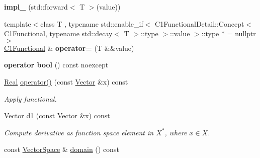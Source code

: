\begin{DoxyCompactItemize}
\item 
\hypertarget{classSpacy_1_1C1Functional_a250d4ea5bc261d8719c1ebb0a5037aac}{{\bfseries impl\-\_\-} (std\-::forward$<$ \-T $>$(value))}\label{classSpacy_1_1C1Functional_a250d4ea5bc261d8719c1ebb0a5037aac}

\item 
\hypertarget{classSpacy_1_1C1Functional_a1a6c4893ea11ebeff6647fc12f8b979d}{{\footnotesize template$<$class T , typename std\-::enable\-\_\-if$<$ C1\-Functional\-Detail\-::\-Concept$<$ C1\-Functional, typename std\-::decay$<$ T $>$\-::type $>$\-::value $>$\-::type $\ast$  = nullptr$>$ }\\\hyperlink{classSpacy_1_1C1Functional}{\-C1\-Functional} \& {\bfseries operator=} (\-T \&\&value)}\label{classSpacy_1_1C1Functional_a1a6c4893ea11ebeff6647fc12f8b979d}

\item 
\hypertarget{classSpacy_1_1C1Functional_a0b5ae1057d50803d71c7e221424e1ed4}{{\bfseries operator bool} () const noexcept}\label{classSpacy_1_1C1Functional_a0b5ae1057d50803d71c7e221424e1ed4}

\item 
\hypertarget{classSpacy_1_1C1Functional_a621b710f0c8c583d074f4bf4da3cbb09}{\hyperlink{classSpacy_1_1Real}{\-Real} \hyperlink{classSpacy_1_1C1Functional_a621b710f0c8c583d074f4bf4da3cbb09}{operator()} (const \hyperlink{classSpacy_1_1Vector}{\-Vector} \&x) const }\label{classSpacy_1_1C1Functional_a621b710f0c8c583d074f4bf4da3cbb09}

\begin{DoxyCompactList}\small\item\em \-Apply functional. \end{DoxyCompactList}\item 
\hypertarget{classSpacy_1_1C1Functional_a5953291c58bf20e87ab2bfe26231fe49}{\hyperlink{classSpacy_1_1Vector}{\-Vector} \hyperlink{classSpacy_1_1C1Functional_a5953291c58bf20e87ab2bfe26231fe49}{d1} (const \hyperlink{classSpacy_1_1Vector}{\-Vector} \&x) const }\label{classSpacy_1_1C1Functional_a5953291c58bf20e87ab2bfe26231fe49}

\begin{DoxyCompactList}\small\item\em \-Compute derivative as function space element in $X^*$, where $x\in X$. \end{DoxyCompactList}\item 
\hypertarget{classSpacy_1_1C1Functional_a3ec8df7e7998b557445c907cbd8e80b8}{const \hyperlink{classSpacy_1_1VectorSpace}{\-Vector\-Space} \& \hyperlink{classSpacy_1_1C1Functional_a3ec8df7e7998b557445c907cbd8e80b8}{domain} () const }\label{classSpacy_1_1C1Functional_a3ec8df7e7998b557445c907cbd8e80b8}


\end{DoxyCompactItemize}
